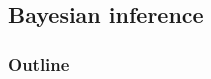 \documentclass[color=usenames,dvipsnames]{beamer}\usepackage[]{graphicx}\usepackage[]{color}
\begin{document}










\subsection{Bayesian inference}


\begin{frame}
  \frametitle{Outline}
  \Large
\end{frame}





\end{document}
